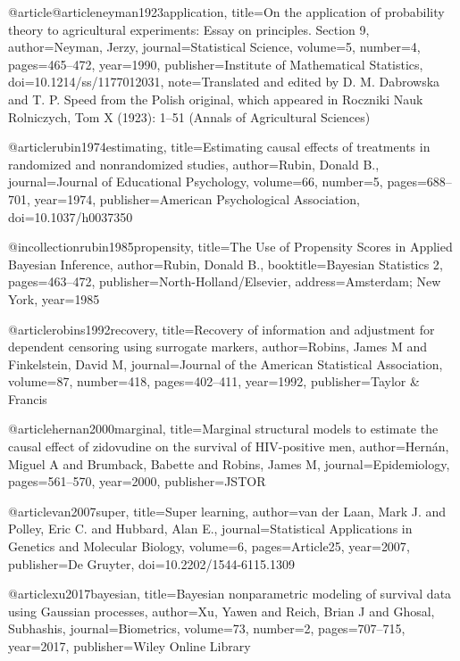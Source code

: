 @article@article{neyman1923application,
  title={On the application of probability theory to agricultural experiments: Essay on principles. Section 9},
  author={Neyman, Jerzy},
  journal={Statistical Science},
  volume={5},
  number={4},
  pages={465--472},
  year={1990},
  publisher={Institute of Mathematical Statistics},
  doi={10.1214/ss/1177012031},
  note={Translated and edited by D. M. Dabrowska and T. P. Speed from the Polish original, which appeared in Roczniki Nauk Rolniczych, Tom X (1923): 1–51 (Annals of Agricultural Sciences)}
}

@article{rubin1974estimating,
  title={Estimating causal effects of treatments in randomized and nonrandomized studies},
  author={Rubin, Donald B.},
  journal={Journal of Educational Psychology},
  volume={66},
  number={5},
  pages={688--701},
  year={1974},
  publisher={American Psychological Association},
  doi={10.1037/h0037350}
}


@incollection{rubin1985propensity,
  title={The Use of Propensity Scores in Applied Bayesian Inference},
  author={Rubin, Donald B.},
  booktitle={Bayesian Statistics 2},
  pages={463--472},
  publisher={North-Holland/Elsevier},
  address={Amsterdam; New York},
  year={1985}
}


@article{robins1992recovery,
  title={Recovery of information and adjustment for dependent censoring using surrogate markers},
  author={Robins, James M and Finkelstein, David M},
  journal={Journal of the American Statistical Association},
  volume={87},
  number={418},
  pages={402--411},
  year={1992},
  publisher={Taylor \& Francis}
}

@article{hernan2000marginal,
  title={Marginal structural models to estimate the causal effect of zidovudine on the survival of HIV-positive men},
  author={Hern{\'a}n, Miguel A and Brumback, Babette and Robins, James M},
  journal={Epidemiology},
  pages={561--570},
  year={2000},
  publisher={JSTOR}
}

@article{van2007super,
  title={Super learning},
  author={van der Laan, Mark J. and Polley, Eric C. and Hubbard, Alan E.},
  journal={Statistical Applications in Genetics and Molecular Biology},
  volume={6},
  pages={Article25},
  year={2007},
  publisher={De Gruyter},
  doi={10.2202/1544-6115.1309}
}


@article{xu2017bayesian,
  title={Bayesian nonparametric modeling of survival data using Gaussian processes},
  author={Xu, Yawen and Reich, Brian J and Ghosal, Subhashis},
  journal={Biometrics},
  volume={73},
  number={2},
  pages={707--715},
  year={2017},
  publisher={Wiley Online Library}
}

